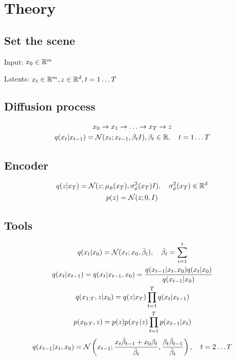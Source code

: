 
\section{Theory}
\subsection{Set the scene}

Input: $x_0\in \mathbb R^m $

Latents: $x_t\in\mathbb R^m,z\in\mathbb R^d, t=1\hdots T$

\subsection{Diffusion process}
\begin{gather}
x_0\rightarrow x_1 \rightarrow  \hdots \rightarrow x_T \rightarrow z \\
q(x_t|x_{t-1})=\mathcal N(x_t;x_{t-1},\beta_t I),\beta_t\in\mathbb R,\quad  t=1\hdots T\\
\end{gather}

\subsection{Encoder}
\begin{gather}
    q(z|x_T)=\mathcal N(z;\mu_\phi (x_T), \sigma^2_\phi (x_T) I), \quad \sigma^2_\phi(x_T)\in \mathbb R^d\\
p(z)=\mathcal N(z;0,I)\\
\end{gather}

\subsection{Tools}
\begin{gather}
    q(x_t|x_0)=\mathcal N(x_t;x_0,\bar\beta_t),\quad \bar\beta_t=\sum_{i=1}^t\\
    q(x_t|x_{t-1}) =q(x_t|x_{t-1}, x_0)=\frac{q(x_{t-1}|x_t, x_0)q(x_t|x_0)}{q(x_{t-1}| x_0)}\\
    q(x_{1:T},z|x_0)=q(z|x_T)\prod_{t=1}^T q(x_t|x_{t-1})\\
    p(x_{0:T},z) = p(z) p(x_T|z)\prod_{t=1}^T p(x_{t-1}|x_t)
 \end{gather}
 \begin{gather}
     q(x_{t-1}|x_t,x_0)=
     \mathcal N\left(x_{t-1}; 
     \frac{
     {x_t\bar\beta_{t-1}}
     +{x_0\beta_t}
     }{\bar\beta_{t}}
     , 
     \frac{\beta_t \bar\beta_{t-1}}{\bar\beta_{t}}
     \right), \quad t=2\hdots T
 \end{gather}


